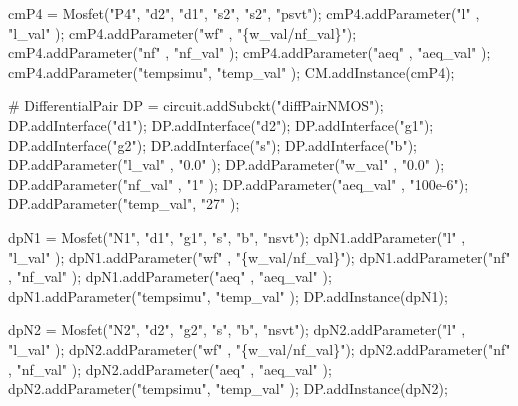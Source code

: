 \begin{DoxyCodeInclude}
cmP4 = Mosfet(\textcolor{stringliteral}{"P4"}, \textcolor{stringliteral}{"d2"}, \textcolor{stringliteral}{"d1"}, \textcolor{stringliteral}{"s2"}, \textcolor{stringliteral}{"s2"}, \textcolor{stringliteral}{"psvt"});
cmP4.addParameter(\textcolor{stringliteral}{"l"}       , \textcolor{stringliteral}{"l\_val"}         );
cmP4.addParameter(\textcolor{stringliteral}{"wf"}      , \textcolor{stringliteral}{"\{w\_val/nf\_val\}"});
cmP4.addParameter(\textcolor{stringliteral}{"nf"}      , \textcolor{stringliteral}{"nf\_val"}        );
cmP4.addParameter(\textcolor{stringliteral}{"aeq"}     , \textcolor{stringliteral}{"aeq\_val"}       );
cmP4.addParameter(\textcolor{stringliteral}{"tempsimu"}, \textcolor{stringliteral}{"temp\_val"}      );
CM.addInstance(cmP4);

\textcolor{comment}{# DifferentialPair}
DP = circuit.addSubckt(\textcolor{stringliteral}{"diffPairNMOS"});
DP.addInterface(\textcolor{stringliteral}{"d1"});
DP.addInterface(\textcolor{stringliteral}{"d2"});
DP.addInterface(\textcolor{stringliteral}{"g1"});
DP.addInterface(\textcolor{stringliteral}{"g2"});
DP.addInterface(\textcolor{stringliteral}{"s"});
DP.addInterface(\textcolor{stringliteral}{"b"});
DP.addParameter(\textcolor{stringliteral}{"l\_val"}   , \textcolor{stringliteral}{"0.0"}   );
DP.addParameter(\textcolor{stringliteral}{"w\_val"}   , \textcolor{stringliteral}{"0.0"}   );
DP.addParameter(\textcolor{stringliteral}{"nf\_val"}  , \textcolor{stringliteral}{"1"}     );
DP.addParameter(\textcolor{stringliteral}{"aeq\_val"} , \textcolor{stringliteral}{"100e-6"});
DP.addParameter(\textcolor{stringliteral}{"temp\_val"}, \textcolor{stringliteral}{"27"}    );

dpN1 = Mosfet(\textcolor{stringliteral}{"N1"}, \textcolor{stringliteral}{"d1"}, \textcolor{stringliteral}{"g1"}, \textcolor{stringliteral}{"s"}, \textcolor{stringliteral}{"b"}, \textcolor{stringliteral}{"nsvt"});
dpN1.addParameter(\textcolor{stringliteral}{"l"}       , \textcolor{stringliteral}{"l\_val"}         );
dpN1.addParameter(\textcolor{stringliteral}{"wf"}      , \textcolor{stringliteral}{"\{w\_val/nf\_val\}"});
dpN1.addParameter(\textcolor{stringliteral}{"nf"}      , \textcolor{stringliteral}{"nf\_val"}        );
dpN1.addParameter(\textcolor{stringliteral}{"aeq"}     , \textcolor{stringliteral}{"aeq\_val"}       );
dpN1.addParameter(\textcolor{stringliteral}{"tempsimu"}, \textcolor{stringliteral}{"temp\_val"}      );
DP.addInstance(dpN1);

dpN2 = Mosfet(\textcolor{stringliteral}{"N2"}, \textcolor{stringliteral}{"d2"}, \textcolor{stringliteral}{"g2"}, \textcolor{stringliteral}{"s"}, \textcolor{stringliteral}{"b"}, \textcolor{stringliteral}{"nsvt"});
dpN2.addParameter(\textcolor{stringliteral}{"l"}       , \textcolor{stringliteral}{"l\_val"}         );
dpN2.addParameter(\textcolor{stringliteral}{"wf"}      , \textcolor{stringliteral}{"\{w\_val/nf\_val\}"});
dpN2.addParameter(\textcolor{stringliteral}{"nf"}      , \textcolor{stringliteral}{"nf\_val"}        );
dpN2.addParameter(\textcolor{stringliteral}{"aeq"}     , \textcolor{stringliteral}{"aeq\_val"}       );
dpN2.addParameter(\textcolor{stringliteral}{"tempsimu"}, \textcolor{stringliteral}{"temp\_val"}      );
DP.addInstance(dpN2);


\end{DoxyCodeInclude}
